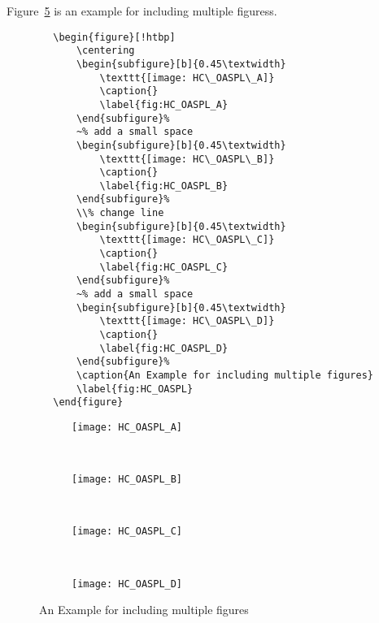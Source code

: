 Figure~\ref{fig:HC_OASPL} is an example for including multiple figuress. 
\begin{center}
    \small
    \begin{verbatim}
        \begin{figure}[!htbp]
            \centering
            \begin{subfigure}[b]{0.45\textwidth}
                \texttt{[image: HC\_OASPL\_A]}
                \caption{}
                \label{fig:HC_OASPL_A}
            \end{subfigure}%
            ~% add a small space
            \begin{subfigure}[b]{0.45\textwidth}
                \texttt{[image: HC\_OASPL\_B]}
                \caption{}
                \label{fig:HC_OASPL_B}
            \end{subfigure}%
            \\% change line
            \begin{subfigure}[b]{0.45\textwidth}
                \texttt{[image: HC\_OASPL\_C]}
                \caption{}
                \label{fig:HC_OASPL_C}
            \end{subfigure}%
            ~% add a small space
            \begin{subfigure}[b]{0.45\textwidth}
                \texttt{[image: HC\_OASPL\_D]}
                \caption{}
                \label{fig:HC_OASPL_D}
            \end{subfigure}%
            \caption{An Example for including multiple figures}
            \label{fig:HC_OASPL}
        \end{figure}
    \end{verbatim}
\end{center}
\begin{figure}[!htbp]
    \centering
    \begin{subfigure}[b]{0.45\textwidth}
        \texttt{[image: HC\_OASPL\_A]}
        \caption{}
        \label{fig:HC_OASPL_A}
    \end{subfigure}%
    ~%
    \begin{subfigure}[b]{0.45\textwidth}
        \texttt{[image: HC\_OASPL\_B]}
        \caption{}
        \label{fig:HC_OASPL_B}
    \end{subfigure}%
    \\%
    \begin{subfigure}[b]{0.45\textwidth}
        \texttt{[image: HC\_OASPL\_C]}
        \caption{}
        \label{fig:HC_OASPL_C}
    \end{subfigure}%
    ~%
    \begin{subfigure}[b]{0.45\textwidth}
        \texttt{[image: HC\_OASPL\_D]}
        \caption{}
        \label{fig:HC_OASPL_D}
    \end{subfigure}%
    \caption{An Example for including multiple figures}
    \label{fig:HC_OASPL}
\end{figure}

